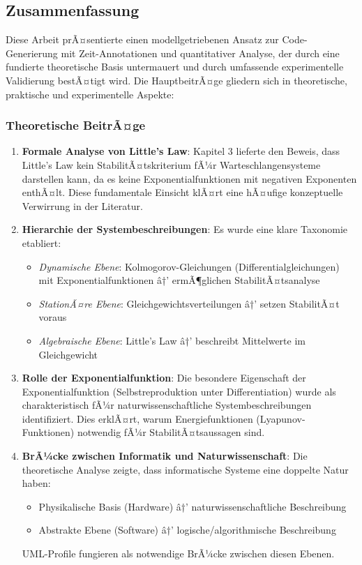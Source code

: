 ﻿\documentclass[a4paper,12pt]{scrreprt}
\theoremstyle{definition}
\begin{document}
\subsection{Zusammenfassung}

Diese Arbeit prÃ¤sentierte einen modellgetriebenen Ansatz zur Code-Generierung mit Zeit-Annotationen und quantitativer Analyse, der durch eine fundierte theoretische Basis untermauert und durch umfassende experimentelle Validierung bestÃ¤tigt wird. Die HauptbeitrÃ¤ge gliedern sich in theoretische, praktische und experimentelle Aspekte:

\subsubsection{Theoretische BeitrÃ¤ge}

\begin{enumerate}
	\item[-] \textbf{Formale Analyse von Little's Law}: Kapitel 3 lieferte den Beweis, dass Little's Law kein StabilitÃ¤tskriterium fÃ¼r Warteschlangensysteme darstellen kann, da es keine Exponentialfunktionen mit negativen Exponenten enthÃ¤lt. Diese fundamentale Einsicht klÃ¤rt eine hÃ¤ufige konzeptuelle Verwirrung in der Literatur.
	
	\item[-] \textbf{Hierarchie der Systembeschreibungen}: Es wurde eine klare Taxonomie etabliert:
	\begin{itemize}
		\item[-] \textit{Dynamische Ebene}: Kolmogorov-Gleichungen (Differentialgleichungen) mit Exponentialfunktionen â†’ ermÃ¶glichen StabilitÃ¤tsanalyse
		\item[-] \textit{StationÃ¤re Ebene}: Gleichgewichtsverteilungen â†’ setzen StabilitÃ¤t voraus
		\item[-] \textit{Algebraische Ebene}: Little's Law â†’ beschreibt Mittelwerte im Gleichgewicht
	\end{itemize}
	
	\item[-] \textbf{Rolle der Exponentialfunktion}: Die besondere Eigenschaft der Exponentialfunktion (Selbstreproduktion unter Differentiation) wurde als charakteristisch fÃ¼r naturwissenschaftliche Systembeschreibungen identifiziert. Dies erklÃ¤rt, warum Energiefunktionen (Lyapunov-Funktionen) notwendig fÃ¼r StabilitÃ¤tsaussagen sind.
	
	\item[-] \textbf{BrÃ¼cke zwischen Informatik und Naturwissenschaft}: Die theoretische Analyse zeigte, dass informatische Systeme eine doppelte Natur haben:
	\begin{itemize}
		\item[-] Physikalische Basis (Hardware) â†’ naturwissenschaftliche Beschreibung
		\item[-] Abstrakte Ebene (Software) â†’ logische/algorithmische Beschreibung
	\end{itemize}
	UML-Profile fungieren als notwendige BrÃ¼cke zwischen diesen Ebenen.
\end{enumerate}
\end{document}
